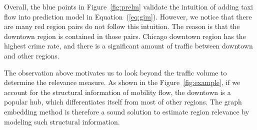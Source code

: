 Overall, the blue points in Figure~\ref{fig:prelm} validate the intuition of adding taxi flow into prediction model in Equation~(\ref{eq:gim}). However, we notice that there are  many red region pairs do not follow this intuition. The reason is that the downtown region is contained in those pairs. Chicago downtown region has the highest crime rate, and there is a significant amount of traffic between downtown and other regions.

The observation above motivates us to look beyond the traffic volume to determine the relevance measure. As shown in the Figure~\ref{fig:example}, if we account for the structural information of mobility flow, the downtown is a popular hub, which differentiates itself from most of other regions. The graph embedding method is therefore a sound solution to estimate region relevance by modeling such structural information.

